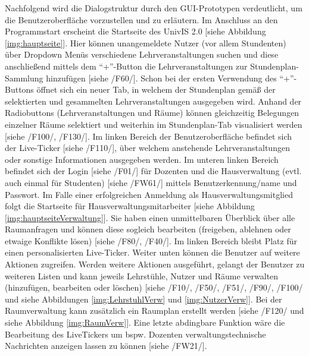 Nachfolgend wird die Dialogstruktur durch den GUI-Prototypen verdeutlicht, um die Benutzeroberfläche vorzustellen und zu erläutern.
Im Anschluss an den Programmstart erscheint die Startseite des UnivIS 2.0 [siehe Abbildung \ref{img:hauptseite}]. Hier können unangemeldete Nutzer (vor allem Stundenten) über Dropdown Menüs verschiedene Lehrveranstaltungen suchen und diese anschließend mittels dem "`+"'-Button die Lehrveranstaltungen zur Stundenplan-Sammlung hinzufügen  [siehe /F60/]. Schon bei der ersten Verwendung des "`+"'-Buttons öffnet sich ein neuer Tab, in welchem der Stundenplan gemäß der selektierten und gesammelten Lehrveranstaltungen ausgegeben wird. Anhand der Radiobuttons (Lehrveranstaltungen und Räume) können gleichzeitig Belegungen einzelner Räume selektiert und weiterhin im Stundenplan-Tab visualisiert werden [siehe /F100/, /F130/].
Im linken Bereich der Benutzeroberfläche befindet sich der Live-Ticker [siehe /F110/], über welchem anstehende Lehrveranstaltungen oder sonstige Informationen ausgegeben werden.
Im unteren linken Bereich befindet sich der Login [siehe /F01/] für Dozenten und die Hausverwaltung (evtl. auch einmal für Studenten) [siehe /FW61/] mittels Benutzerkennung/name und Passwort.
Im Falle einer erfolgreichen Anmeldung als Hausverwaltungsmitglied folgt die Startseite für Hausverwaltungsmitarbeiter [siehe Abbildung \ref{img:hauptseiteVerwaltung}]. 
Sie haben einen unmittelbaren Überblick über alle Raumanfragen und können diese sogleich bearbeiten (freigeben, ablehnen oder etwaige Konflikte lösen) [siehe /F80/, /F40/].
Im linken Bereich bleibt Platz für einen personalisierten Live-Ticker. Weiter unten können die Benutzer auf weitere Aktionen zugreifen.
Werden weitere Aktionen ausgeführt, gelangt der Benutzer zu weiteren Listen und kann jeweils Lehrstühle, Nutzer und Räume verwalten (hinzufügen, bearbeiten oder löschen) [siehe /F10/, /F50/, /F51/, /F90/, /F100/ und siehe Abbildungen \ref{img:LehrstuhlVerw} und \ref{img:NutzerVerw}]. Bei der Raumverwaltung kann zusätzlich ein Raumplan erstellt werden [siehe /F120/ und siehe Abbildung \ref{img:RaumVerw}].
Eine letzte abdingbare Funktion wäre die Bearbeitung des LiveTickers um bspw. Dozenten verwaltungstechnische Nachrichten anzeigen lassen zu können [siehe /FW21/].
